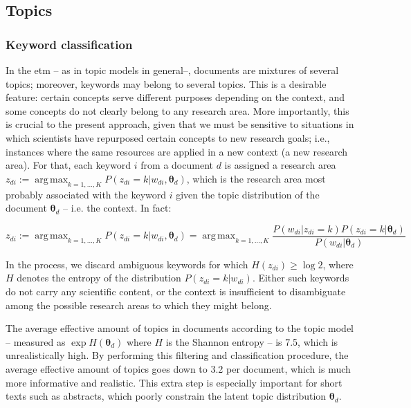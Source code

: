 \documentclass{article}
\DeclareMathOperator*{\argmax}{arg\,max}
\begin{document}
\subsection{\label{appendix:topics}Topics}

\subsubsection{\label{appendix:keywords}Keyword classification}

In the \gls{etm} -- as in topic models in general--, documents are mixtures of several topics; moreover, keywords may belong to several topics. This is a desirable feature: certain concepts serve different purposes depending on the context, and some concepts do not clearly belong to any research area. More importantly, this is crucial to the present approach, given that we must be sensitive to situations in which scientists have repurposed certain concepts to new research goals; i.e., instances where the same resources are applied in a new context (a new research area).
For that, each keyword $i$ from a document $d$ is assigned a research area $z_{di} := \argmax_{k=1,\dots,K} P(z_{di}=k|w_{di},\bm{\theta}_{d})$, which is the research area most probably associated with the keyword $i$ given the topic distribution of the document $\bm{\theta}_d$ -- i.e. the context. In fact:

\begin{equation}
    z_{di} := \argmax_{k=1,\dots,K} P(z_{di}=k|w_{di},\bm{\theta}_{d}) =  \argmax_{k=1,\dots,K} \dfrac{P(w_{di}|z_{di}=k)P(z_{di}=k|\bm{\theta}_d)}{P(w_{di}|\bm{\theta}_d)}
\end{equation}

In the process, we discard ambiguous keywords for which $H(z_{di})\geq \log{2}$, where $H$ denotes the entropy of the distribution $P(z_{di}=k|w_{di})$. Either such keywords do not carry any scientific content, or the context is insufficient to disambiguate among the possible research areas to which they might belong.

The average effective amount of topics in documents according to the topic model -- measured as $\exp H(\bm{\theta}_{d})$ where $H$ is the Shannon entropy -- is 7.5, which is unrealistically high. By performing this filtering and classification procedure, the average effective amount of topics goes down to 3.2 per document, which is much more informative and realistic. This extra step is especially important for short texts such as abstracts, which poorly constrain the latent topic distribution $\bm{\theta}_{d}$.
\end{document}
